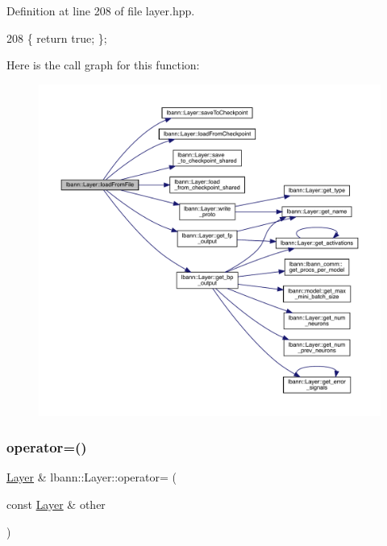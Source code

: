 Definition at line 208 of file layer.\+hpp.


\begin{DoxyCode}
208 \{ \textcolor{keywordflow}{return} \textcolor{keyword}{true}; \};
\end{DoxyCode}
Here is the call graph for this function\+:\nopagebreak
\begin{figure}[H]
\begin{center}
\leavevmode
\includegraphics[width=350pt]{classlbann_1_1Layer_a1ae0e6015dd427c63236a07f8cbd3878_cgraph}
\end{center}
\end{figure}
\mbox{\label{classlbann_1_1Layer_a00d8acde68fda2f38c4a39ef8c89234a}} 
\subsubsection{\texorpdfstring{operator=()}{operator=()}}
{\footnotesize\ttfamily \hyperlink{classlbann_1_1Layer}{Layer} \& lbann\+::\+Layer\+::operator= (\begin{DoxyParamCaption}\item[{const \hyperlink{classlbann_1_1Layer}{Layer} \&}]{other }\end{DoxyParamCaption})}




